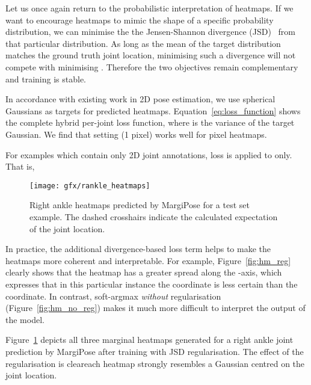 \documentclass[australian,10pt,twocolumn,letterpaper,twocolumn]{article}
\makeatletter
\newcommand{\ourmodel}{MargiPose}
\renewcommand{\paragraph}{\@startsection{paragraph}{4}{\z@}{0.7ex \@plus 0.2ex \@minus 0.2ex}{-1em}{\normalfont\normalsize\bfseries}}
\makeatother
\begin{document}
Let us once again return to the probabilistic interpretation of heatmaps.
If we want to encourage heatmaps to mimic the shape of a specific
probability distribution, we can minimise the the Jensen-Shannon divergence
(JSD)~\citep{lin1991divergence} from that particular distribution.
As long as the mean of the target distribution matches the ground
truth joint location, minimising such a divergence will not compete
with minimising . Therefore the two objectives
remain complementary and training is stable.

In accordance with existing work in 2D pose estimation, we use spherical
Gaussians as targets for predicted heatmaps. Equation~\ref{eq:loss_function}
shows the complete hybrid per-joint loss function, where 
is the variance of the target Gaussian. We find that setting 
(1 pixel) works well for  pixel heatmaps.


For examples which contain only 2D joint annotations, loss is applied
to  only. That is,


\begin{figure}
\begin{centering}
\texttt{[image: gfx/rankle\_heatmaps]}
\par\end{centering}
\caption{\label{fig:rankle_heatmaps}Right ankle heatmaps predicted by \ourmodel{}
for a test set example. The dashed crosshairs indicate the calculated
expectation of the joint location.}
\end{figure}
In practice, the additional divergence-based loss term helps to make
the heatmaps more coherent and interpretable. For example, Figure~\ref{fig:hm_reg}
clearly shows that the heatmap has a greater spread along the -axis,
which expresses that in this particular instance the  coordinate
is less certain than the  coordinate. In contrast, soft-argmax
\emph{without} regularisation (Figure~\ref{fig:hm_no_reg}) makes
it much more difficult to interpret the output of the model.

Figure~\ref{fig:rankle_heatmaps} depicts all three marginal heatmaps
generated for a right ankle joint prediction by \ourmodel{} after
training with JSD regularisation. The effect of the regularisation
is clear\textemdash each heatmap strongly resembles a Gaussian centred
on the joint location.

\paragraph{Applying the loss.}
\end{document}
